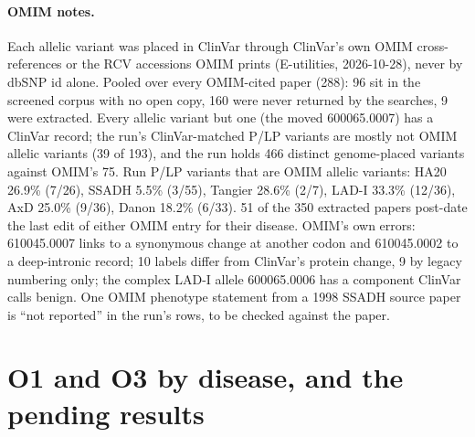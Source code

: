 \documentclass{article} %
\begin{document}
\paragraph{OMIM notes.} Each allelic variant was placed in ClinVar through ClinVar's own OMIM cross-references or the RCV accessions OMIM prints (E-utilities, 2026-10-28), never by dbSNP id alone. Pooled over every OMIM-cited paper (288): 96 sit in the screened corpus with no open copy, 160 were never returned by the searches, 9 were extracted. Every allelic variant but one (the moved 600065.0007) has a ClinVar record; the run's ClinVar-matched P/LP variants are mostly not OMIM allelic variants (39 of 193), and the run holds 466 distinct genome-placed variants against OMIM's 75. Run P/LP variants that are OMIM allelic variants: HA20 26.9\% (7/26), SSADH 5.5\% (3/55), Tangier 28.6\% (2/7), LAD-I 33.3\% (12/36), AxD 25.0\% (9/36), Danon 18.2\% (6/33). 51 of the 350 extracted papers post-date the last edit of either OMIM entry for their disease. OMIM's own errors: 610045.0007 links to a synonymous change at another codon and 610045.0002 to a deep-intronic record; 10 labels differ from ClinVar's protein change, 9 by legacy numbering only; the complex LAD-I allele 600065.0006 has a component ClinVar calls benign. One OMIM phenotype statement from a 1998 SSADH source paper is ``not reported'' in the run's rows, to be checked against the paper.

\section{O1 and O3 by disease, and the pending results}
\label{app:o1o3}
\end{document}
